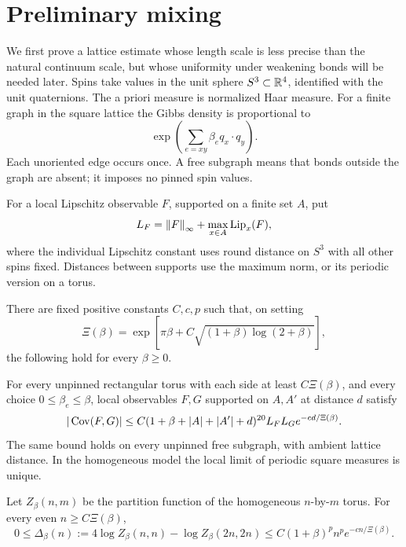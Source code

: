 \section{Preliminary mixing}\label{pre:mixing}\label{pre:section}

We first prove a lattice estimate whose length scale is less precise than the
natural continuum scale, but whose uniformity under weakening bonds will be
needed later. Spins take values in the unit sphere \(S^3\subset\mathbb R^4\), identified
with the unit quaternions. The a priori measure is normalized Haar measure.
For a finite graph in the square lattice the Gibbs density is proportional to
\[
 \exp\left(\sum_{e=xy}\beta_e q_x\cdot q_y\right).
\]
Each unoriented edge occurs once. A free subgraph means that bonds outside the
graph are absent; it imposes no pinned spin values.

For a local Lipschitz observable \(F\), supported on a finite set \(A\), put
\[
 L_F=\left\lVert F\right\rVert_\infty+\max_{x\in A}\operatorname{Lip}_x(F),
\]
where the individual Lipschitz constant uses round distance on \(S^3\) with
all other spins fixed. Distances between supports use the maximum norm, or
its periodic version on a torus.

\begin{theorem}\label{thm:preliminary}
There are fixed positive constants \(C,c,p\) such that, on setting
\begin{equation}
 \Xi(\beta)=\exp\left[\pi\beta+
 C\sqrt{(1+\beta)\log(2+\beta)}\right],
 \label{eq:pre:Xi}
\end{equation}
the following hold for every \(\beta\geq0\).

For every unpinned rectangular torus with each side at least \(C\Xi(\beta)\),
and every choice \(0\leq\beta_e\leq\beta\), local observables \(F,G\) supported
on \(A,A'\) at distance \(d\) satisfy
\begin{equation}
 |\operatorname{Cov}(F,G)|\leq C(1+\beta+|A|+|A'|+d)^{20}
 L_FL_G e^{-cd/\Xi(\beta)}.
 \label{eq:pre:theorem-mixing}
\end{equation}
The same bound holds on every unpinned free subgraph, with ambient lattice
distance. In the homogeneous model the local limit of periodic square
measures is unique.

Let \(Z_\beta(n,m)\) be the partition function of the homogeneous
\(n\)-by-\(m\) torus. For every even \(n\geq C\Xi(\beta)\),
\begin{equation}
 0\leq\Delta_\beta(n):=4\log Z_\beta(n,n)-\log Z_\beta(2n,2n)
 \leq C(1+\beta)^pn^p e^{-cn/\Xi(\beta)}.
 \label{eq:pre:theorem-delta}
\end{equation}
\end{theorem}

